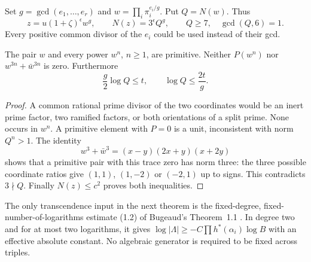 \begin{definition}\label{def:xc-content}
Set $g=\gcd(e_1,\ldots,e_r)$ and
$w=\prod_i\pi_i^{e_i/g}$. Put $Q=N(w)$. Thus
\begin{equation}\label{eq:xc-content}
 z=u(1+\zeta)^\epsilon w^g,\qquad
 N(z)=3^\epsilon Q^g,\qquad Q\ge7,\quad\gcd(Q,6)=1.
\end{equation}
Every positive common divisor of the $e_i$ could be used instead of their gcd.
\end{definition}

\begin{lemma}\label{lem:xc-primitive}
The pair $w$ and every power $w^n$, $n\ge1$, are primitive. Neither $P(w^n)$
nor $w^{3n}+\bar w^{3n}$ is zero. Furthermore
\[
 \frac g2\log Q\le t,\qquad \log Q\le\frac{2t}{g}.
\]
\end{lemma}
\begin{proof}
A common rational prime divisor of the two coordinates would be an inert
prime factor, two ramified factors, or both orientations of a split prime.
None occurs in $w^n$. A primitive element with $P=0$ is a unit, inconsistent
with norm $Q^n>1$. The identity
\begin{equation}\label{eq:xc-trace}
 w^3+\bar w^3=(x-y)(2x+y)(x+2y)
\end{equation}
shows that a primitive pair with this trace zero has norm three: the three
possible coordinate ratios give $(1,1)$, $(1,-2)$ or $(-2,1)$ up to signs.
This contradicts $3\nmid Q$. Finally $N(z)\le c^2$ proves both inequalities.
\end{proof}

The only transcendence input in the next theorem is the fixed-degree,
fixed-number-of-logarithms estimate (1.2) of Bugeaud's Theorem~1.1
\cite{moving:bugeaud}. In degree two and for at most two logarithms, it gives
$\log|\Lambda|\ge-C\prod h^*(\alpha_i)\log B$ with an effective absolute
constant. No algebraic generator is required to be fixed across triples.


